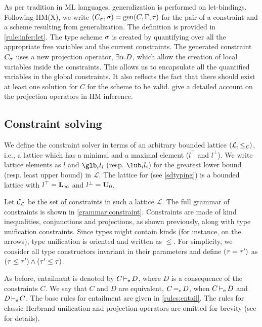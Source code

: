 As per tradition in ML languages, generalization is performed
on let-bindings.
Following HM(X), we write $(C_\sigma, \sigma) = \operatorname{\text{gen}}(C,\Gamma,\tau)$
for the pair of a constraint and a scheme resulting from
generalization. The definition is provided in \cref{rule:infer:let}.
The type scheme $\sigma$ is created by quantifying over all the appropriate
free variables and the current constraints.
The generated constraint $C_\sigma$ uses a new projection operator,
$\exists \alpha.D$, which
allow the creation of local variables inside the constraints.
This allows us to encapsulate all the quantified variables in the global constraints.
It also reflects the fact that there
should exist at least one solution for $C$ for the scheme to be valid.
\citet{DBLP:journals/tapos/OderskySW99} give a detailed account
on the projection operators in HM inference.


\subsection{Constraint solving}
\label{infer:solving}

\newcommand\A{\mathcal A}
\newcommand\SC{\mathcal S}

We define the constraint solver in terms of an arbitrary bounded
lattice $(\mathcal L, \leq_\mathcal L)$, i.e.,
a lattice which has a minimal and a maximal element ($l^\top$ and $l^\bot$).
We write lattice elements as $l$ and $\glb_i l_i$ (resp. $\lub_i l_i$)
for the greatest lower bound (resp. least upper bound) in $\mathcal L$.
The lattice for \lang (see \cref{sdtyping}) is a bounded lattice with
$l^\top = \mathbf{L}_\infty$ and $l^\bot = \mathbf{U}_0$.

Let ${\mathcal C_{\mathcal L}}$ be the set of constraints in such a lattice $\mathcal L$.
The full grammar of constraints is shown in \cref{grammar:constraint}.
Constraints are made of kind inequalities, conjunctions and
projections, as shown previously, along with type unification
constraints. Since types might contain kinds (for instance, on the arrows),
type unification is oriented and written as $\leq$.
For simplicity, we consider all type constructors
invariant in their parameters
and define $(\tau = \tau')$ as $(\tau \leq \tau') \wedge (\tau' \leq \tau)$.

As before, entailment is denoted by $C \operatorname{\vdash_e} D$,
where $D$ is a consequence of the constraints $C$.
We say that $C$ and $D$ are equivalent, $C \operatorname{=_e} D$,
when $C \operatorname{\vdash_e} D$ and $D \operatorname{\vdash_e} C$.
The base rules for entailment are given in \cref{rules:entail}.
The rules for classic Herbrand unification and
projection operators are omitted for brevity (see
\citep{DBLP:journals/tapos/OderskySW99} for
details).

